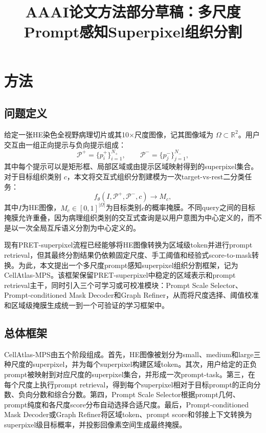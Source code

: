 \documentclass[UTF8]{ctexart}
\title{AAAI论文方法部分草稿：多尺度Prompt感知Superpixel组织分割}
\author{}
\date{}
\begin{document}
\maketitle

\section{方法}

\subsection{问题定义}

给定一张HE染色全视野病理切片或其10$\times$尺度图像，记其图像域为
$\Omega \subset \mathbb{R}^{2}$。用户交互由一组正向提示与负向提示组成：
\begin{equation}
    \mathcal{P}^{+}=\{p_i^{+}\}_{i=1}^{N_{+}}, \qquad
    \mathcal{P}^{-}=\{p_j^{-}\}_{j=1}^{N_{-}},
\end{equation}
其中每个提示可以是矩形框、局部区域或由提示区域映射得到的superpixel集合。对于目标组织类别
$c$，本文将交互式组织分割建模为一次target-vs-rest二分类任务：
\begin{equation}
    f_{\theta}(I,\mathcal{P}^{+},\mathcal{P}^{-},c) \rightarrow M_c,
\end{equation}
其中$I$为HE图像，$M_c \in [0,1]^{|\Omega|}$为目标类别$c$的概率掩膜。不同query之间的目标掩膜允许重叠，因为病理组织类别的交互式查询是以用户意图为中心定义的，而不是以一次全局互斥语义分割为中心定义的。

现有PRET-superpixel流程已经能够将HE图像转换为区域级token并进行prompt retrieval，但其最终分割结果仍依赖固定尺度、手工阈值和经验式score-to-mask转换。为此，本文提出一个多尺度prompt感知superpixel组织分割框架，记为CellAtlas-MPS。该框架保留PRET-superpixel中稳定的区域表示和prompt retrieval主干，同时引入三个可学习或可校准模块：Prompt Scale Selector、Prompt-conditioned Mask Decoder和Graph Refiner，从而将尺度选择、阈值校准和区域级掩膜生成统一到一个可验证的学习框架中。

\subsection{总体框架}

CellAtlas-MPS由五个阶段组成。首先，HE图像被划分为small、medium和large三种尺度的superpixel，并为每个superpixel构建区域token。其次，用户给定的正负prompt被映射到对应尺度的superpixel集合，并形成一次prompt-task。第三，在每个尺度上执行prompt retrieval，得到每个superpixel相对于目标prompt的正向分数、负向分数和综合分数。第四，Prompt Scale Selector根据prompt几何、prompt纯度和各尺度score分布自动选择合适尺度。最后，Prompt-conditioned Mask Decoder或Graph Refiner将区域token、prompt score和邻接上下文转换为superpixel级目标概率，并投影回像素空间生成最终掩膜。
\end{document}
